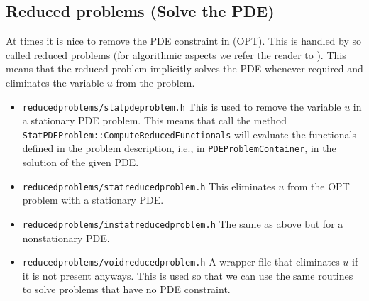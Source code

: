 \subsection{Reduced problems (Solve the PDE)}
At times it is nice to remove the PDE constraint in (OPT). 
This is handled by so called reduced 
problems (for algorithmic aspects we refer the reader to 
\cite{BeMeVe06}). 
This means that the reduced problem implicitly solves the PDE whenever required
and eliminates the variable $u$ from the problem.
\begin{itemize}
\item \texttt{reducedproblems/statpdeproblem.h} This is used to remove the variable $u$ in 
  a stationary PDE problem. This means that call the method \\
  \texttt{StatPDEProblem::ComputeReducedFunctionals} will evaluate the functionals 
  defined in the problem description, i.e., in \texttt{PDEProblemContainer}, in the 
  solution of the given PDE.
\item \texttt{reducedproblems/statreducedproblem.h} This eliminates $u$ from the OPT
  problem with a stationary PDE.
\item \texttt{reducedproblems/instatreducedproblem.h} The same as above but for a
  nonstationary PDE.
\item \texttt{reducedproblems/voidreducedproblem.h} A wrapper file that eliminates $u$ 
  if it is not present anyways. This is used so that we can use the same routines to 
  solve problems that have no PDE constraint.
\end{itemize}

